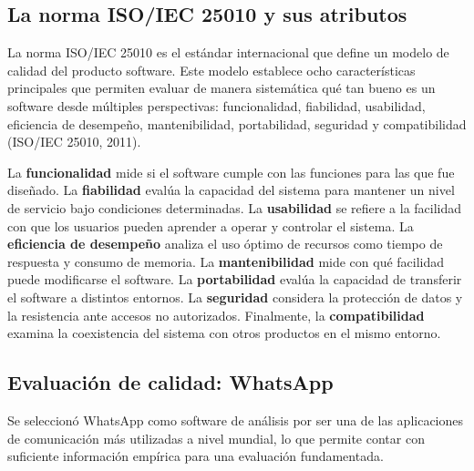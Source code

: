 \documentclass[12pt,a4paper]{article}
\begin{document}
	\subsection{La norma ISO/IEC 25010 y sus atributos}
	
	La norma ISO/IEC 25010 es el estándar internacional que define un modelo de calidad del producto software. Este modelo establece ocho características principales que permiten evaluar de manera sistemática qué tan bueno es un software desde múltiples perspectivas: funcionalidad, fiabilidad, usabilidad, eficiencia de desempeño, mantenibilidad, portabilidad, seguridad y compatibilidad (ISO/IEC 25010, 2011).
	
	La \textbf{funcionalidad} mide si el software cumple con las funciones para las que fue diseñado. La \textbf{fiabilidad} evalúa la capacidad del sistema para mantener un nivel de servicio bajo condiciones determinadas. La \textbf{usabilidad} se refiere a la facilidad con que los usuarios pueden aprender a operar y controlar el sistema. La \textbf{eficiencia de desempeño} analiza el uso óptimo de recursos como tiempo de respuesta y consumo de memoria. La \textbf{mantenibilidad} mide con qué facilidad puede modificarse el software. La \textbf{portabilidad} evalúa la capacidad de transferir el software a distintos entornos. La \textbf{seguridad} considera la protección de datos y la resistencia ante accesos no autorizados. Finalmente, la \textbf{compatibilidad} examina la coexistencia del sistema con otros productos en el mismo entorno.
	
	\subsection{Evaluación de calidad: WhatsApp}
	
	Se seleccionó WhatsApp como software de análisis por ser una de las aplicaciones de comunicación más utilizadas a nivel mundial, lo que permite contar con suficiente información empírica para una evaluación fundamentada.
	
\end{document}
